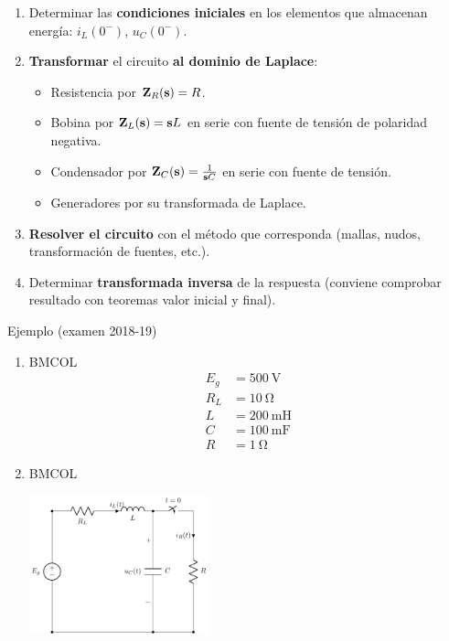 \begin{enumerate}
\item Determinar las \textbf{condiciones iniciales} en los elementos que almacenan energía: \(i_L(0^-)\), \(u_C(0^-)\).
\item \textbf{Transformar} el circuito \textbf{al dominio de Laplace}:
\begin{itemize}
\item Resistencia por \(\mathbf{Z}_R(\mathbf{s}) = R\).
\item Bobina por \(\mathbf{Z}_L(\mathbf{s}) = \mathbf{s} L\) en serie con fuente de tensión de polaridad negativa.
\item Condensador por \(\mathbf{Z}_C(\mathbf{s}) = \frac{1}{\mathbf{s} C}\) en serie con fuente de tensión.
\item Generadores por su transformada de Laplace.
\end{itemize}
\item \textbf{Resolver el circuito} con el método que corresponda (mallas, nudos, transformación de fuentes, etc.).
\item Determinar \textbf{transformada inversa} de la respuesta (conviene comprobar resultado con teoremas valor inicial y final).
\end{enumerate}

{Ejemplo (examen 2018-19)}

\begin{enumerate}
\item \hfill{}\textsc{BMCOL}
\label{sec:org5965283}
\begin{align*}
  E_g &= \SI{500}{\volt}\\
  R_{L}&= \SI{10}{\ohm}\\
  L &= \SI{200}{\milli\henry}\\
  C &= \SI{100}{\milli\farad}\\
  R &= \SI{1}{\ohm}
\end{align*}

\item \hfill{}\textsc{BMCOL}
\label{sec:org3517b3e}
\begin{center}
\includegraphics[height=4cm]{../figs/E2_circuito.pdf}
\end{center}
\end{enumerate}

